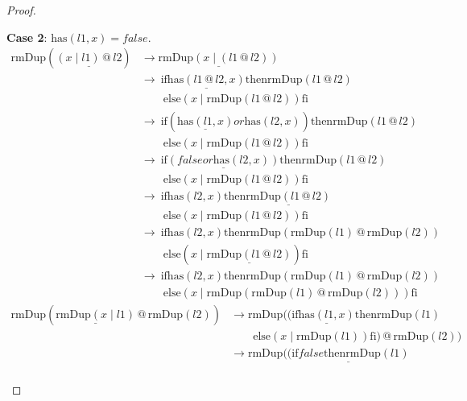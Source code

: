 \documentclass[12pt, a4paper]{article}
\newcommand{\rel}[1]{\mathrel{#1}}
\newcommand{\rmx}[1]{\mathrm{#1}}
\newcommand{\larrow}{\longrightarrow}
\newcommand{\under}{\underline}
\begin{document}
\begin{proof}
\begin{description}
\textbf{Case 2}: $\rmx{has}(l1, x) = false$.
\begin{align*}
\rmx{rmDup}(\under{(x \mid l1) \rel{@} l2})
	&\larrow \under{\rmx{rmDup}(x \mid (l1 \rel{@} l2))} \tag{by @2} \\
	&\larrow\ \rel{\rmx{if}} \under{\rmx{has}(l1 \rel{@} l2, x)} \rel{\rmx{then}} \rmx{rmDup}(l1 \rel{@} l2) \\
	&\quad \quad \rel{\rmx{else}} (x \mid \rmx{rmDup}(l1 \rel{@} l2)) \rel{\rmx{fi}} \tag{by rmDup2} \\
	&\larrow\ \rel{\rmx{if}} (\under{\rmx{has}(l1, x)} \rel{or} \rmx{has}(l2, x)) \rel{\rmx{then}} \rmx{rmDup}(l1 \rel{@} l2) \\
	&\quad \quad \rel{\rmx{else}} (x \mid \rmx{rmDup}(l1 \rel{@} l2)) \rel{\rmx{fi}} \tag{by Problem 6 - Lemma 1} \\
	&\larrow\ \rel{\rmx{if}} \under{(false \rel{or} \rmx{has}(l2, x))} \rel{\rmx{then}} \rmx{rmDup}(l1 \rel{@} l2) \\
	&\quad \quad \rel{\rmx{else}} (x \mid \rmx{rmDup}(l1 \rel{@} l2)) \rel{\rmx{fi}} \tag{by case splitting} \\
	&\larrow\ \rel{\rmx{if}} \rmx{has}(l2, x) \rel{\rmx{then}} \under{\rmx{rmDup}(l1 \rel{@} l2)} \\
	&\quad \quad \rel{\rmx{else}} (x \mid \rmx{rmDup}(l1 \rel{@} l2)) \rel{\rmx{fi}} \tag{by or} \\
	&\larrow\ \rel{\rmx{if}} \rmx{has}(l2, x) \rel{\rmx{then}} \rmx{rmDup}(\rmx{rmDup}(l1) \rel{@} \rmx{rmDup}(l2)) \\
	&\quad \quad \rel{\rmx{else}} (x \mid \under{\rmx{rmDup}(l1 \rel{@} l2)}) \rel{\rmx{fi}} \tag{by IH} \\
	&\larrow\ \rel{\rmx{if}} \rmx{has}(l2, x) \rel{\rmx{then}} \rmx{rmDup}(\rmx{rmDup}(l1) \rel{@} \rmx{rmDup}(l2)) \\
	&\quad \quad \rel{\rmx{else}} (x \mid \rmx{rmDup}(\rmx{rmDup}(l1) \rel{@} \rmx{rmDup}(l2))) \rel{\rmx{fi}} \tag{by IH}
\end{align*}
\begin{align*}
\rmx{rmDup}(\under{\rmx{rmDup}(x \mid l1)} \rel{@} \rmx{rmDup}(l2))
	&\larrow \rmx{rmDup}((\rel{\rmx{if}} \under{\rmx{has}(l1, x)} \rel{\rmx{then}} \rmx{rmDup}(l1) \\
	&\quad \quad \rel{\rmx{else}} (x \mid \rmx{rmDup}(l1)) \rel{\rmx{fi}}) \rel{@} \rmx{rmDup}(l2)) \tag{by rmDup2} \\
	&\larrow \rmx{rmDup}(\under{(\rel{\rmx{if}} false \rel{\rmx{then}} \rmx{rmDup}(l1)} \\

\end{align*}
\end{description}
\end{proof}
\end{document}
